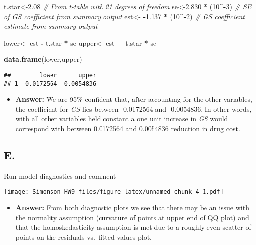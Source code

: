 \documentclass[]{article}
\newenvironment{Shaded}{\begin{snugshade}}{\end{snugshade}}
\newcommand{\KeywordTok}[1]{\textcolor[rgb]{0.13,0.29,0.53}{\textbf{#1}}}
\newcommand{\DecValTok}[1]{\textcolor[rgb]{0.00,0.00,0.81}{#1}}
\newcommand{\FloatTok}[1]{\textcolor[rgb]{0.00,0.00,0.81}{#1}}
\newcommand{\StringTok}[1]{\textcolor[rgb]{0.31,0.60,0.02}{#1}}
\newcommand{\CommentTok}[1]{\textcolor[rgb]{0.56,0.35,0.01}{\textit{#1}}}
\newcommand{\OperatorTok}[1]{\textcolor[rgb]{0.81,0.36,0.00}{\textbf{#1}}}
\newcommand{\NormalTok}[1]{#1}
\providecommand{\tightlist}{%
  \setlength{\itemsep}{0pt}\setlength{\parskip}{0pt}}
\begin{document}
\begin{Shaded}
\begin{Highlighting}[]
\NormalTok{t.star<-}\FloatTok{2.08} \CommentTok{# From t-table with 21 degrees of freedom}
\NormalTok{se<-}\FloatTok{2.830} \OperatorTok{*}\StringTok{ }\NormalTok{(}\DecValTok{10}\OperatorTok{^-}\DecValTok{3}\NormalTok{) }\CommentTok{# SE of GS coefficient from summary output}
\NormalTok{est<-}\StringTok{ }\OperatorTok{-}\FloatTok{1.137} \OperatorTok{*}\StringTok{ }\NormalTok{(}\DecValTok{10}\OperatorTok{^-}\DecValTok{2}\NormalTok{) }\CommentTok{# GS coefficient estimate from summary output}

\NormalTok{lower<-}\StringTok{ }\NormalTok{est }\OperatorTok{-}\StringTok{ }\NormalTok{t.star }\OperatorTok{*}\StringTok{ }\NormalTok{se}
\NormalTok{upper<-}\StringTok{ }\NormalTok{est }\OperatorTok{+}\StringTok{ }\NormalTok{t.star }\OperatorTok{*}\StringTok{ }\NormalTok{se}

\KeywordTok{data.frame}\NormalTok{(lower,upper)}
\end{Highlighting}
\end{Shaded}

\begin{verbatim}
##        lower      upper
## 1 -0.0172564 -0.0054836
\end{verbatim}

\begin{itemize}
\tightlist
\item
  \textbf{Answer:} We are 95\% confident that, after accounting for the
  other variables, the coefficient for \emph{GS} lies between -0.0172564
  and -0.0054836. In other words, with all other variables held constant
  a one unit increase in \emph{GS} would correspond with between
  0.0172564 and 0.0054836 reduction in drug cost.
\end{itemize}

\subsection{E.}\label{e.}

Run model diagnostics and comment

\texttt{[image: Simonson\_HW9\_files/figure-latex/unnamed-chunk-4-1.pdf]}

\begin{itemize}
\tightlist
\item
  \textbf{Answer:} From both diagnostic plots we see that there may be
  an issue with the normality assumption (curvature of points at upper
  end of QQ plot) and that the homoskedasticity assumption is met due to
  a roughly even scatter of points on the residuals vs.~fitted values
  plot.
\end{itemize}
\end{document}
